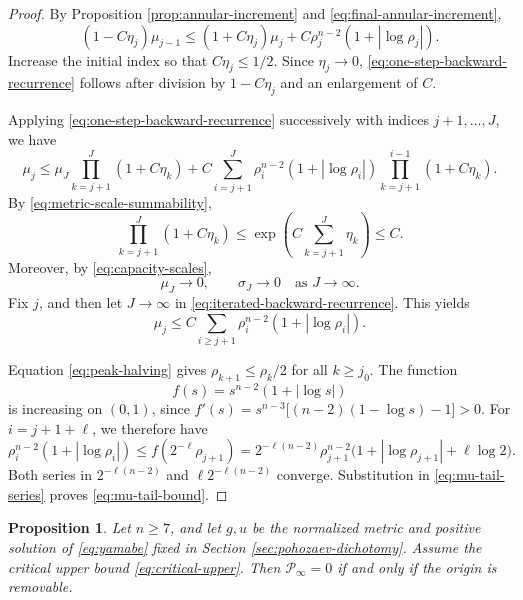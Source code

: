 \documentclass[11pt]{article}
\numberwithin{equation}{section}
\newtheorem{proposition}[theorem]{Proposition}
\theoremstyle{remark}
\newcommand{\cP}{\mathcal P}
\begin{document}
\par
\begin{proof}
By Proposition  \ref{prop:annular-increment} and
\eqref{eq:final-annular-increment},
\[
 (1-C\eta_j)\mu_{j-1}
 \le(1+C\eta_j)\mu_j
 +C\rho_j^{n-2}(1+|\log\rho_j|).
\]
Increase the initial index so that \(C\eta_j\le1/2\).
Since \(\eta_j\to0\),
\eqref{eq:one-step-backward-recurrence} follows
after division by \(1-C\eta_j\) and an enlargement of \(C\).

Applying \eqref{eq:one-step-backward-recurrence} successively with indices
\(j+1,\ldots,J\), we have
\begin{equation}\label{eq:iterated-backward-recurrence}
 \mu_j\le{}\mu_J\prod_{k=j+1}^J(1+C\eta_k)
 +C\sum_{i=j+1}^J
 \rho_i^{n-2}(1+|\log\rho_i|)
 \prod_{k=j+1}^{i-1}(1+C\eta_k).
\end{equation}
By \eqref{eq:metric-scale-summability},
\[
 \prod_{k=j+1}^J(1+C\eta_k)
 \le\exp\left(C\sum_{k=j+1}^J\eta_k\right)\le C.
\]
Moreover, by \eqref{eq:capacity-scales},
\[
 \mu_J\to0,\qquad \sigma_J\to0
 \quad\text{as }J\to\infty.
\]
Fix \(j\), and then let \(J\to\infty\) in
\eqref{eq:iterated-backward-recurrence}. This yields
\begin{equation}\label{eq:mu-tail-series}
 \mu_j\le C\sum_{i\ge j+1}
 \rho_i^{n-2}(1+|\log\rho_i|).
\end{equation}

Equation  \eqref{eq:peak-halving} gives
\(\rho_{k+1}\le\rho_k/2\) for all \(k\ge j_0\). The function
\[
 f(s)=s^{n-2}(1+|\log s|)
\]
is increasing on \((0,1)\), since \(f'(s)=s^{n-3}\bigl[(n-2)(1-\log s)-1\bigr]>0\).
For \(i=j+1+\ell\), we therefore have
\[
 \rho_i^{n-2}(1+|\log\rho_i|)
 \le f(2^{-\ell}\rho_{j+1})
 =2^{-\ell(n-2)}\rho_{j+1}^{n-2}
 \bigl(1+|\log\rho_{j+1}|+\ell\log2\bigr).
\]
Both series in \(2^{-\ell(n-2)}\) and
\(\ell2^{-\ell(n-2)}\) converge.  Substitution in
\eqref{eq:mu-tail-series} proves
\eqref{eq:mu-tail-bound}.
\end{proof}

\par
\begin{proposition}\label{prop:pohozaev-removability}
Let \(n\ge7\), and let \(g,u\) be the normalized metric and positive
solution of \eqref{eq:yamabe} fixed in
Section  \ref{sec:pohozaev-dichotomy}. Assume the critical upper bound
\eqref{eq:critical-upper}. Then \(\cP_\infty=0\) if and only if the
origin is removable.
\end{proposition}
\end{document}
